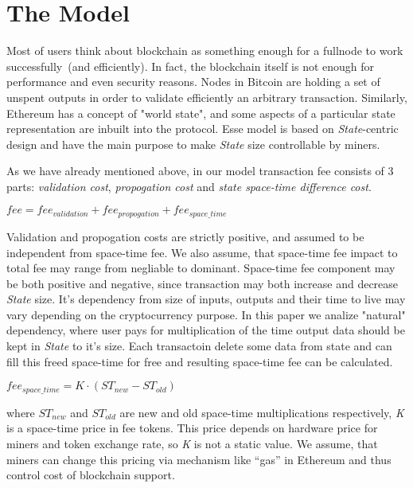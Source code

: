 \documentclass[]{article}   %
\newcommand{\authnote}[2]{\marginpar{\parbox{\marginparwidth}{\tiny %
  \textsf{#1 {\textcolor{blue}{notes: #2}}}}}%
  \textcolor{blue}{\textbf{\dag}}}
\newcommand{\authnote}[2]{
  \textsf{#1 \textcolor{blue}{: #2}}}
\newcommand{\authnote}[2]{}
\newcommand{\dnote}[1]{{\authnote{\textcolor{blue}{Dima notes}}{#1}}}
\newcommand{\esse}{Esse}
\newcommand{\state}{\textit{State}}
\begin{document}
\dnote{write somewhere about lost coins and deflation}

\section{The Model}
\label{sec:model}

Most of users think about blockchain as something enough for a fullnode to work successfully~(and efficiently). In fact, the blockchain itself is not enough for performance and even security reasons. Nodes in Bitcoin are holding a set of unspent outputs in order to validate efficiently an arbitrary transaction. Similarly, Ethereum\cite{ethyp} has a concept of "world state", and some aspects of a particular state representation are inbuilt into the protocol. \esse{} model is based on \state{}-centric design and have the main purpose to make \state{} size controllable by miners.

As we have already mentioned above, in our model transaction fee consists of 3 parts: \textit{validation cost}, \textit{propogation cost} and \textit{state space-time difference cost}.

$fee = fee_{validation} + fee_{propogation} + fee_{space\_time}$ \dnote{should we require from total fee to be positive?}

Validation and propogation costs are strictly positive, and assumed to be independent from space-time fee. We also assume, that space-time fee impact to total fee may range from negliable to dominant. Space-time fee component may be both positive and negative, since transaction may both increase and decrease \state{} size. It's dependency from size of inputs, outputs and their time to live may vary depending on the cryptocurrency purpose. In this paper we analize "natural" dependency, where user pays for multiplication of the time output data should be kept in \state{} to it's size. Each transactoin delete some data from state and can fill this freed space-time for free and resulting space-time fee can be calculated.

$fee_{space\_time} = K \cdot (ST_{new} - ST_{old})$

where \textit{$ST_{new}$} and \textit{$ST_{old}$} are new and old space-time multiplications respectively, \textit{K} is a space-time price in fee tokens. This price depends on hardware price for miners and token exchange rate, so \textit{K} is not a static value. We assume, that miners can change this pricing via mechanism like ``gas'' in Ethereum and thus control cost of blockchain support.
\end{document}
